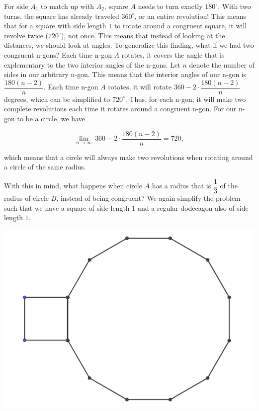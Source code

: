\documentclass{article}
\begin{document}
For side $A_1$ to match up with $A_2$, square $A$ needs to turn exactly $180^{\circ}$. With two turns, the square has already traveled $360^{\circ}$, or an entire revolution! This means that for a square with side length $1$ to rotate around a congruent square, it will revolve twice ($720^{\circ}$), not once. This means that instead of looking at the distances, we should look at angles. To generalize this finding, what if we had two congruent n-gons? Each time n-gon $A$ rotates, it covers the angle that is explementary to the two interior angles of the n-gons. Let $n$ denote the number of sides in our arbitrary n-gon. This means that the interior angles of our n-gon is $\dfrac{180(n-2)}{n}$. Each time n-gon $A$ rotates, it will rotate $360 - 2 \cdot \dfrac{180(n-2)}{n}$ degrees, which can be simplified to $720^{\circ}$. Thus, for each n-gon, it will make two complete revolutions each time it rotates around a congruent n-gon. For our n-gon to be a circle, we have

$$\lim\limits_{n\to\infty}\ 360 - 2 \cdot \dfrac{180(n-2)}{n} = 720,$$

which means that a circle will always make two revolutions when rotating around a circle of the same radius. 

With this in mind, what happens when circle $A$ has a radius that is $\dfrac{1}{3}$ of the radius of circle $B$, instead of being congruent? We again simplify the problem such that we have a square of side length $1$ and a regular dodecagon also of side length $1$. 

\begin{center}
\includegraphics[scale=0.5]{images/squareanddodecagon.png}
\end{center}
\end{document}
